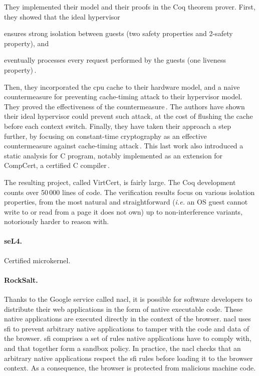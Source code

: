 They implemented their model and their proofs in the Coq theorem prover.
%
First, they showed that the ideal hypervisor
%
\begin{inparaenum}[(1)]
\item ensures strong isolation between guests (two safety properties and
  2-safety property), and
%
\item eventually processes every request performed by the guests (one liveness
  property)\,\cite{barthe2011virtcert1}.
\end{inparaenum}
%
Then, they incorporated the \ac{cpu} cache to their hardware model, and a naive
countermeasure for preventing cache-timing attack to their hypervisor model.
%
They proved the effectiveness of the countermeasure\,\cite{barthe2012virtcert2}.
%
The authors have shown their ideal hypervisor could prevent such attack, at the
cost of flushing the cache before each context switch.
%
Finally, they have taken their approach a step further, by focusing on
constant-time cryptography as an effective countermeasure against cache-timing
attack\,\cite{barthe2014virtcert3}.
%
This last work also introduced a static analysis for C program, notably
implemented as an extension for CompCert, a certified C
compiler\,\cite{leroy2012compcert}.

The resulting project, called VirtCert, is fairly large.
%
The Coq development counts over 50\,000 lines of code.
%
The verification results focus on various isolation properties, from the most
natural and straightforward (\emph{i.e.} an OS guest cannot write to or read
from a page it does not own) up to non-interference variants, notoriously harder
to reason with.

\paragraph{seL4.}
%
Certified microkernel.
%

\paragraph{RockSalt.}
%
Thanks to the Google service called \ac{nacl}, it is possible for software
developers to distribute their web applications in the form of native executable
code.
%
These native applications are executed directly in the context of the browser.
%
\ac{nacl} uses \ac{sfi} to prevent arbitrary native applications to tamper with
the code and data of the browser.
%
\ac{sfi} comprises a set of rules native applications have to comply with, and
that together form a sandbox policy.
%
In practice, the \ac{nacl} checks that an arbitrary native applications respect
the \ac{sfi} rules before loading it to the browser context.
%
As a consequence, the browser is protected from malicious machine code.

